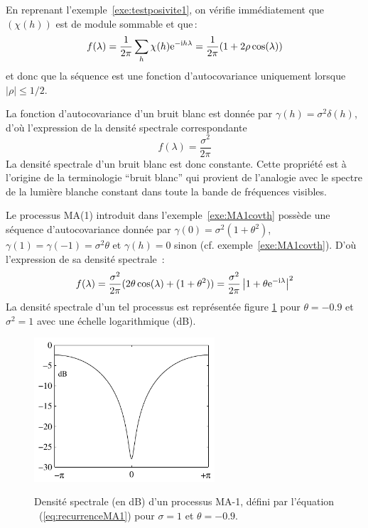 \begin{example}
En reprenant l'exemple~\ref{exe:testposivite1}, on v\'erifie
imm\'ediatement que $(\chi(h))$ est de module sommable et que\,:
$$
 f(\lambda)=\frac{1}{2\pi}\sum_h \chi(h)\mathrm{e}^{-\mathrm{i} h \lambda}
     =\frac{1}{2\pi}(1+2\rho\cos( \lambda))
     $$
     et donc que la s\'equence est une fonction d'autocovariance uniquement
     lorsque $|\rho|\leq 1/2$.
\end{example}
\begin{example}
  La fonction d'autocovariance d'un bruit blanc est donn\'ee par $\gamma(h)=
  \sigma^2 \delta(h)$, d'o\`u l'expression de la densit\'e spectrale correspondante
\[
 f(\lambda) = \frac{\sigma^2}{2\pi}
\]
La densit\'e spectrale d'un bruit blanc est donc constante. Cette
propri\'et\'e est \`a l'origine de la terminologie ``bruit blanc'' qui
provient de l'analogie avec le spectre de la lumi\`ere blanche
constant dans toute la bande de fr\'equences visibles.
\end{example}
\begin{example}
  \label{ex:MA1dsp}
  Le processus MA(1) introduit dans l'exemple~\ref{exe:MA1covth} poss\`ede une
  s\'equence d'autocovariance donn\'ee par $\gamma(0) = \sigma^2(1+\theta^2)$,
  $\gamma(1) = \gamma(-1) = \sigma^2 \theta$ et $\gamma(h) = 0$ sinon (cf.
  exemple~\ref{exe:MA1covth}). D'o\`u l'expression de sa densit\'e spectrale~:
\[
 f(\lambda)= \frac{\sigma^2}{2 \pi} (2 \theta \cos(\lambda) + (1+ \theta^2))
     = \frac{\sigma^2}{2 \pi} \left |1+ \theta \mathrm{e}^{-\mathrm{i}\lambda}\right |^2
\]
La densit\'e spectrale d'un tel processus est repr\'esent\'ee figure
\ref{fig:dspthMA1} pour $\theta = -0.9$ et $\sigma^2=1$ avec une
\'echelle logarithmique (dB).
\end{example}
\begin{figure}
  \centering
  \includegraphics[width=0.6\textwidth]{Figures/dspthMA1}\\
  \caption{Densit\'e spectrale (en dB) d'un processus MA-1, d\'efini par l'\'equation
~(\ref{eq:recurrenceMA1}) pour $\sigma=1$ et $\theta=-0.9$.}\label{fig:dspthMA1}
\end{figure}

